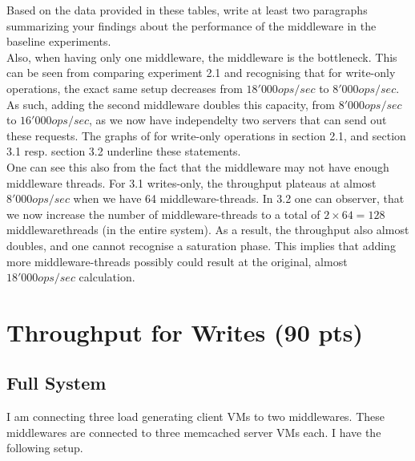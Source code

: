 \documentclass[11pt,a4paper]{article}
\begin{document}
Based on the data provided in these tables, write at least two paragraphs summarizing your findings about the performance of the middleware in the baseline experiments. \\

Also, when having only one middleware, the middleware is the bottleneck.
This can be seen from comparing experiment 2.1 and recognising that for write-only operations, the exact same setup decreases from $18'000 ops/sec$ to $8'000 ops/sec$.
As such, adding the second middleware doubles this capacity, from $8'000 ops/sec$ to $16'000 ops/sec$, as we now have independelty two servers that can send out these requests.
The graphs of for write-only operations in section 2.1, and section 3.1 resp. section 3.2 underline these statements. \\

One can see this also from the fact that the middleware may not have enough middleware threads.
For 3.1 writes-only, the throughput plateaus at almost $8'000 ops/sec$ when we have 64 middleware-threads.
In 3.2 one can observer, that we now increase the number of middleware-threads to a total of $2 \times 64 = 128$ middlewarethreads (in the entire system). 
As a result, the throughput also almost doubles, and one cannot recognise a saturation phase.
This implies that adding more middleware-threads possibly could result at the original, almost $18'000 ops/sec$ calculation. \\






\section{Throughput for Writes (90 pts)}

\subsection{Full System}
I am connecting three load generating client VMs to two middlewares.
These middlewares are connected to three memcached server VMs each.
I have the following setup.
\end{document}
